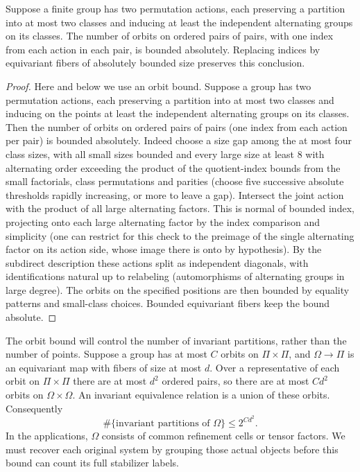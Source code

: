 \begin{lemma}\label{c:orbit-bound}
Suppose a finite group has two permutation actions, each preserving a partition into at most two classes and inducing at least the independent alternating groups on its classes. The number of orbits on ordered pairs of pairs, with one index from each action in each pair, is bounded absolutely. Replacing indices by equivariant fibers of absolutely bounded size preserves this conclusion.
\end{lemma}

\begin{proof}
Here and below we use an orbit bound. Suppose a group has two permutation actions, each preserving a partition into at most two classes and inducing on the points at least the independent alternating groups on its classes. Then the number of orbits on ordered pairs of pairs (one index from each action per pair) is bounded absolutely. Indeed choose a size gap among the at most four class sizes, with all small sizes bounded and every large size at least 8 with alternating order exceeding the product of the quotient-index bounds from the small factorials, class permutations and parities (choose five successive absolute thresholds rapidly increasing, or more to leave a gap). Intersect the joint action with the product of all large alternating factors. This is normal of bounded index, projecting onto each large alternating factor by the index comparison and simplicity (one can restrict for this check to the preimage of the single alternating factor on its action side, whose image there is onto by hypothesis). By the subdirect description these actions split as independent diagonals, with identifications natural up to relabeling (automorphisms of alternating groups in large degree). The orbits on the specified positions are then bounded by equality patterns and small-class choices. Bounded equivariant fibers keep the bound absolute.
\end{proof}

The orbit bound will control the number of invariant partitions, rather
than the number of points. Suppose a group has at most $C$ orbits on
$\Pi\times\Pi$, and $\Omega\to\Pi$ is an equivariant map with fibers of
size at most $d$. Over a representative of each orbit on $\Pi\times\Pi$
there are at most $d^2$ ordered pairs, so there are at most $Cd^2$ orbits
on $\Omega\times\Omega$. An invariant equivalence relation is a union
of these orbits. Consequently
\begin{equation}\label{c:partition-bound}
 \#\{\text{invariant partitions of }\Omega\}\le 2^{Cd^2}.
\end{equation}
In the applications, $\Omega$ consists of common refinement cells or
tensor factors. We must recover each original system by grouping those
actual objects before this bound can count its full stabilizer labels.

